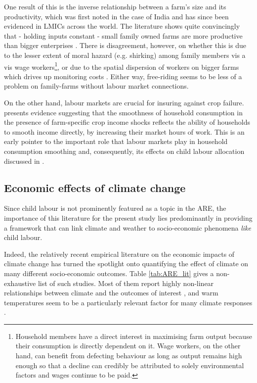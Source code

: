 \documentclass[a4paper,12pt]{article}
\theoremstyle{plain}
\theoremstyle{definition}
\theoremstyle{definition}
\theoremstyle{definition}
\theoremstyle{definition}
\begin{document}
One result of this is the inverse relationship between a farm's size and its productivity, which was first noted in the case of India \citep{Sen1962} and has since been evidenced in LMICs across the world. The literature shows quite convincingly that - holding inputs constant - small family owned farms are more productive than bigger enterprises \citep{Sen1981a,Sen1981}. There is disagreement, however, on whether this is due to the lesser extent of moral hazard (e.g. shirking) among family members vis a vis wage workers\footnote{Household members have a direct interest in maximising farm output because their consumption is directly dependent on it. Wage workers, on the other hand, can benefit from defecting behaviour as long as output remains high enough so that a decline can credibly be attributed to solely environmental factors and wages continue to be paid.}, or due to the spatial dispersion of workers on bigger farms which drives up monitoring costs \citep{Sen1981a}. Either way, free-riding seems to be less of a problem on family-farms without labour market connections.

On the other hand, labour markets are crucial for insuring against crop failure. \citet{Kochar1999} presents evidence suggesting that the smoothness of household consumption in the presence of farm-specific crop income shocks reflects the ability of households to smooth income directly, by increasing their market hours of work. This is an early pointer to the important role that labour markets play in household consumption smoothing and, consequently, its effects on child labour allocation discussed in \citet{Dumas2015,Dumas2020}.

\subsection{Economic effects of climate change}
\label{sub:economic_effects_of_climate_change}

 Since child labour is not prominently featured as a topic in the ARE, the importance of this literature for the present study lies predominantly in providing a framework that can link climate and weather to socio-economic phenomena \textit{like} child labour.

Indeed, the relatively recent empirical literature on the economic impacts of climate change has turned the spotlight onto quantifying the effect of climate on many different socio-economic outcomes. Table \ref{tab:ARE_lit} gives a non-exhaustive list of such studies. Most of them report highly non-linear relationships between climate and the outcomes of interest \citep[e.g.][]{Schlenker2009,Burke2015}, and warm temperatures seem to be a particularly relevant factor for many climate responses \citep{Auffhammer2013}.
\end{document}
